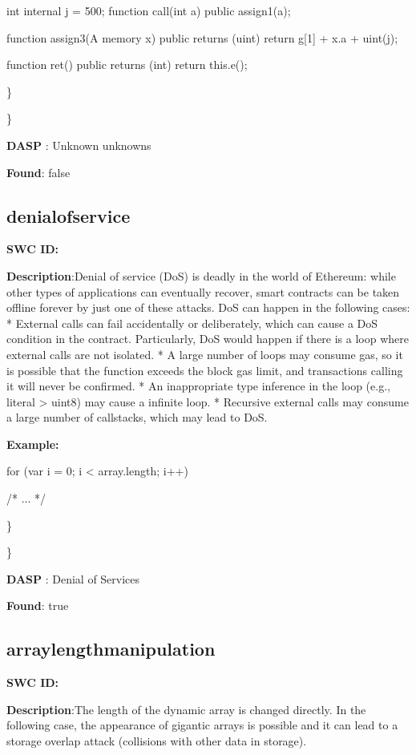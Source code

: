 \documentclass{article}
\begin{document}
{{{    }
  int internal j = 500;
function call(int a) public {
        assign1(a);
    }

    function assign3(A memory x) public returns (uint) {
        return g[1] + x.a + uint(j);
    }

    function ret() public returns (int){
        return this.e();
  }
}

\} 

\} 

\textbf{DASP} : Unknown unknowns

\textbf{Found}: false

\subsection{denial\textunderscore of\textunderscore service} 
\textbf{SWC \textunderscore ID:} 

\textbf{Description}:Denial of service (DoS) is deadly in the world of Ethereum: while other types of applications can eventually recover, smart contracts can be taken offline forever by just one of these attacks. DoS can happen in the following cases:
* External calls can fail accidentally or deliberately, which can cause a DoS condition in the contract. Particularly, DoS would happen if there is a loop where external calls are not isolated.
* A large number of loops may consume gas, so it is possible that the function exceeds the block gas limit, and transactions calling it will never be confirmed.
* An inappropriate type inference in the loop (e.g., literal \textendash > uint8) may cause a infinite loop.
* Recursive external calls may consume a large number of callstacks, which may lead to DoS.


\textbf{Example:} 

for (var i = 0; i < array.length; i++) { /* ... */

\} 

\} 

\textbf{DASP} : Denial of Services

\textbf{Found}: true

\subsection{array\textunderscore length\textunderscore manipulation} 
\textbf{SWC \textunderscore ID:} 

\textbf{Description}:The length of the dynamic array is changed directly. In the following case, the appearance of gigantic arrays is possible and it can lead to a storage overlap attack (collisions with other data in storage).


}}
\end{document}

